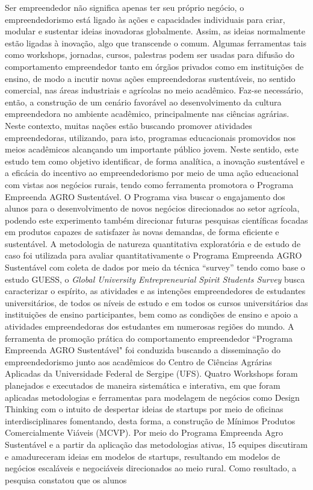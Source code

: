 \setlength{\absparsep}{18pt} %
\begin{resumo}

Ser empreendedor não significa apenas ter seu próprio negócio, o empreendedorismo está ligado às ações e capacidades individuais para criar, modular e sustentar ideias inovadoras globalmente. Assim, as ideias normalmente estão ligadas à inovação, algo que transcende o comum. Algumas ferramentas tais como workshops, jornadas, cursos, palestras podem ser usadas para difusão do comportamento empreendedor tanto em órgãos privados como em instituições de ensino, de modo a incutir novas ações empreendedoras sustentáveis, no sentido comercial, nas áreas industriais e agrícolas no meio acadêmico. Faz-se necessário, então, a construção de um cenário favorável ao desenvolvimento da cultura empreendedora no ambiente acadêmico, principalmente nas ciências agrárias. Neste contexto, muitas nações estão buscando promover atividades empreendedoras, utilizando, para isto, programas educacionais promovidos nos meios acadêmicos alcançando um importante público jovem. Neste sentido, este estudo tem como objetivo identificar, de forma analítica, a inovação sustentável e a eficácia do incentivo ao empreendedorismo por meio de uma ação educacional com vistas aos negócios rurais, tendo como ferramenta promotora o Programa Empreenda AGRO Sustentável. O Programa visa buscar o engajamento dos alunos para o desenvolvimento de novos negócios direcionados ao setor agrícola, podendo este experimento também direcionar futuras pesquisas científicas focadas em produtos capazes de satisfazer às novas demandas, de forma eficiente e sustentável. A metodologia de natureza quantitativa exploratória e de estudo de caso foi utilizada para avaliar quantitativamente o Programa Empreenda AGRO Sustentável com coleta de dados por meio da técnica “survey” tendo como base o estudo GUESS, o \textit{Global University Entrepreneurial Spirit Students Survey} busca caracterizar o espírito, as atividades e as intenções empreendedores de estudantes universitários, de todos os níveis de estudo e em todos os cursos universitários das instituições de ensino participantes, bem como as condições de ensino e apoio a atividades empreendedoras dos estudantes em numerosas regiões do mundo. A ferramenta de promoção prática do comportamento empreendedor “Programa Empreenda AGRO Sustentável" foi conduzida buscando a disseminação do empreendedorismo junto aos acadêmicos do Centro de Ciências Agrárias Aplicadas da Universidade Federal de Sergipe (UFS). Quatro Workshops foram planejados e executados de maneira sistemática e interativa, em que foram aplicadas metodologias e ferramentas para modelagem de negócios como Design Thinking com o intuito de despertar ideias de startups por meio de oficinas interdisciplinares fomentando, desta forma, a construção de Mínimos Produtos Comercialmente Viáveis (MCVP). Por meio do Programa Empreenda Agro Sustentável e a partir da aplicação das metodologias ativas, 15 equipes discutiram e amadureceram ideias em modelos de startups, resultando em modelos de negócios escaláveis e negociáveis direcionados ao meio rural. Como resultado, a pesquisa constatou que os alunos 
\end{resumo}
